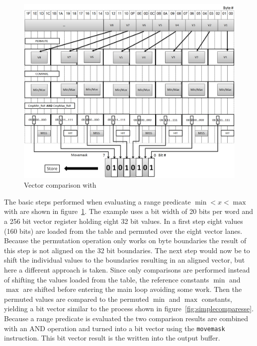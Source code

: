\vspace{.5cm}

\begin{figure}[h] \begin{center}
\includegraphics[scale=.3]{images/scan.png}
\end{center}
\caption{Vector comparison with \simdscan{}~\cite{AVX2-Scan}}
\label{fig:simdscan}
\end{figure}

The basic steps performed when evaluating a range predicate $\min < x < \max$
with \simdscan{} are shown in figure~\ref{fig:simdscan}. The example uses a bit
width of 20 bits per word and a 256 bit vector register holding eight 32 bit
values.  In a first step eight values (160 bits) are loaded from the table and
permuted over the eight vector lanes. Because the permutation operation only
works on byte boundaries the result of this step is not aligned on the 32 bit
boundaries.  The next step would now be to shift the individual values to the
boundaries resulting in an aligned vector, but here a different approach is
taken. Since only comparisons are performed instead of shifting the values
loaded from the table, the reference constants $\min$ and $\max$ are shifted
before entering the main loop avoiding some work. Then the permuted values are
compared to the permuted $\min$ and $\max$ constants, yielding a bit vector
similar to the process shown in figure~\ref{fig:simplecomparesse}. Because a
range predicate is evaluated the two comparison results are combined with an AND
operation and turned into a bit vector using the \texttt{movemask} instruction.
This bit vector result is the written into the output buffer.


